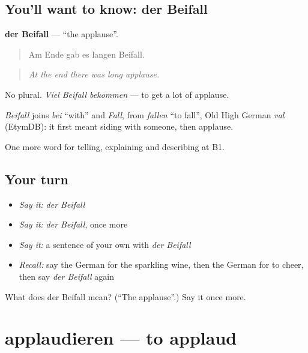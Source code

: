 \subsection*{You'll want to know: der Beifall}
\textbf{der Beifall} — \textquotedblleft{}the applause\textquotedblright{}.

\begin{quote}
Am Ende gab es langen Beifall.
\end{quote}

\begin{quote}
\emph{At the end there was long applause.}
\end{quote}

No plural. \emph{Viel Beifall bekommen} — to get a lot of applause.

\begin{cousinweb}
\emph{Beifall} joins \emph{bei} \textquotedblleft{}with\textquotedblright{} and \emph{Fall}, from \emph{fallen} \textquotedblleft{}to fall\textquotedblright{}, Old High German \emph{val} (EtymDB): it first meant siding with someone, then applause.
\end{cousinweb}

\begin{grammarlens}[title={What you've built}]
One more word for telling, explaining and describing at B1.
\end{grammarlens}

\subsection*{Your turn}
\begin{itemize}
\raggedright
  \item \emph{Say it:} \emph{der Beifall}
  \item \emph{Say it:} \emph{der Beifall}, once more
  \item \emph{Say it:} a sentence of your own with \emph{der Beifall}
  \item \emph{Recall:} say the German for the sparkling wine, then the German for to cheer, then say \emph{der Beifall} again
\end{itemize}

\begin{tcolorbox}[breakable,colback=teal!4,colframe=teal!35!black,title={Before you move on}]
What does der Beifall mean? (\textquotedblleft{}The applause\textquotedblright{}.) Say it once more.
\end{tcolorbox}
\section[applaudieren]{applaudieren — to applaud}


